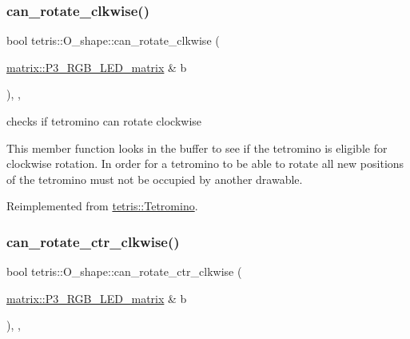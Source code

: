 \subsubsection{\texorpdfstring{can\+\_\+rotate\+\_\+clkwise()}{can\_rotate\_clkwise()}}
{\footnotesize\ttfamily bool tetris\+::\+O\+\_\+shape\+::can\+\_\+rotate\+\_\+clkwise (\begin{DoxyParamCaption}\item[{\hyperlink{classmatrix_1_1P3__RGB__LED__matrix}{matrix\+::\+P3\+\_\+\+R\+G\+B\+\_\+\+L\+E\+D\+\_\+matrix} \&}]{b }\end{DoxyParamCaption})\hspace{0.3cm}{\ttfamily [inline]}, {\ttfamily [override]}, {\ttfamily [virtual]}}



checks if tetromino can rotate clockwise 

This member function looks in the buffer to see if the tetromino is eligible for clockwise rotation. In order for a tetromino to be able to rotate all new positions of the tetromino must not be occupied by another drawable. 

Reimplemented from \hyperlink{classtetris_1_1Tetromino_a7572a9fba3397bf92dba30f79bec908b}{tetris\+::\+Tetromino}.

\mbox{\label{classtetris_1_1O__shape_ae53421645f59627b6c6c7d26a59f2d6a}} 
\subsubsection{\texorpdfstring{can\+\_\+rotate\+\_\+ctr\+\_\+clkwise()}{can\_rotate\_ctr\_clkwise()}}
{\footnotesize\ttfamily bool tetris\+::\+O\+\_\+shape\+::can\+\_\+rotate\+\_\+ctr\+\_\+clkwise (\begin{DoxyParamCaption}\item[{\hyperlink{classmatrix_1_1P3__RGB__LED__matrix}{matrix\+::\+P3\+\_\+\+R\+G\+B\+\_\+\+L\+E\+D\+\_\+matrix} \&}]{b }\end{DoxyParamCaption})\hspace{0.3cm}{\ttfamily [inline]}, {\ttfamily [override]}, {\ttfamily [virtual]}}



